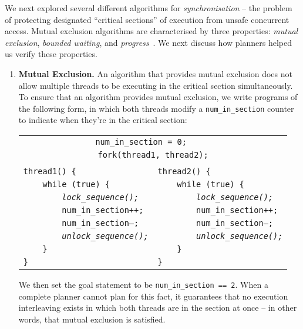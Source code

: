 We next explored several different algorithms for {\em synchronisation} -- the problem of protecting designated ``critical sections'' of execution from unsafe concurrent access. Mutual exclusion algorithms are characterised by three properties: {\em mutual exclusion}, {\em bounded waiting}, and {\em progress}~\cite{de0u}. We next discuss how planners helped us verify these properties.

\begin{enumerate}
	\item {\bf Mutual Exclusion.} An algorithm that provides mutual exclusion does not allow multiple threads to be executing in the critical section simultaneously.
	To ensure that an algorithm provides mutual exclusion, we write programs of the following form, in which both threads modify a \texttt{num\_in\_section} counter to indicate when they're in the critical section:
	\begin{center}
	\begin{tabular}{ll}
	\multicolumn{2}{c}{\texttt{num\_in\_section = 0;~~~~~}} \\
	\multicolumn{2}{c}{\texttt{fork(thread1, thread2);}} \\
	& \\
	\texttt{thread1() \{} & \texttt{thread2() \{} \\
	\texttt{~~~~while (true) \{} & \texttt{~~~~while (true) \{} \\
	\texttt{~~~~~~~~\em lock\_sequence();} & \texttt{~~~~~~~~\em lock\_sequence();} \\
	\texttt{~~~~~~~~num\_in\_section++;} & \texttt{~~~~~~~~num\_in\_section++;} \\
	\texttt{~~~~~~~~num\_in\_section--;} & \texttt{~~~~~~~~num\_in\_section--;} \\
	\texttt{~~~~~~~~\em unlock\_sequence();\qquad} & \texttt{~~~~~~~~\em unlock\_sequence();} \\
	\texttt{~~~~\}} & \texttt{~~~~\}} \\
	\texttt{\}} & \texttt{\}} \\
	\end{tabular}
	\end{center}
	We then set the goal statement to be \texttt{num\_in\_section == 2}. When a complete planner cannot plan for this fact, it guarantees that no execution interleaving exists in which both threads are in the section at once -- in other words, that mutual exclusion is satisfied.


\end{enumerate}
